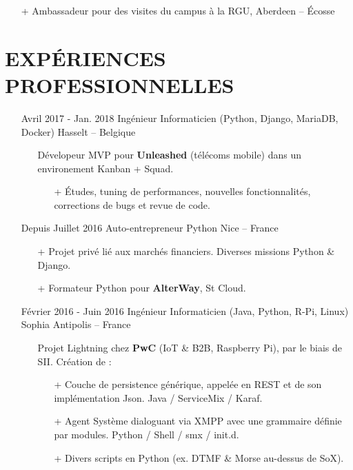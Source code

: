 \documentclass{res}
\begin{document}
\begin{resume}
\begin{itemize}
\begin{itemize}
                  \item[+]  Ambassadeur pour des visites du campus \`a la RGU, Aberdeen -- \'Ecosse
		\end{itemize} 
	\end{itemize}
	
\section{EXP\'ERIENCES PROFESSIONNELLES}

	\begin{itemize}
		\item[] Avril 2017 - Jan. 2018 \tabto{5cm} Ing\'enieur Informaticien (Python, Django, MariaDB, Docker) \hfill Hasselt -- Belgique
		\begin{itemize}
			\item[] D\'evelopeur MVP pour \textbf{Unleashed} (t\'el\'ecoms mobile) dans un environement Kanban + Squad.
			\begin{itemize}
				\item[+] \'Etudes, tuning de performances, nouvelles fonctionnalit\'es, corrections de bugs et revue de code.
			\end{itemize}
		\end{itemize}
		\item[] Depuis Juillet 2016 \tabto{5cm} Auto-entrepreneur Python \hfill Nice -- France
		\begin{itemize}
			\item[+] Projet priv\'e li\'e aux march\'es financiers. Diverses missions Python \& Django.
			\item[+] Formateur Python pour \textbf{AlterWay}, St Cloud. 
		\end{itemize}
		\item[] F\'evrier 2016 - Juin 2016 \tabto{5cm} Ing\'enieur Informaticien (Java, Python, R-Pi, Linux) \hfill Sophia Antipolis -- France
		\begin{itemize}
			\item[] Projet Lightning chez \textbf{PwC} (IoT \& B2B, Raspberry Pi), par le biais de SII. Cr\'eation de :
			\begin{itemize}
				\item[+] Couche de persistence g\'en\'erique, appel\'ee en REST et de son impl\'ementation Json. Java / ServiceMix / Karaf.
				\item[+] Agent Syst\`eme dialoguant via XMPP avec une grammaire d\'efinie par modules. Python / Shell / smx / init.d.
				\item[+] Divers scripts en Python (ex. DTMF \& Morse au-dessus de SoX). 

\end{itemize}
\end{itemize}
\end{itemize}
\end{resume}
\end{document}
